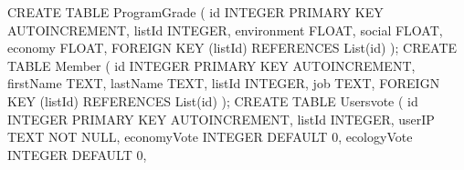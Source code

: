 CREATE TABLE ProgramGrade
    \newline\indent\indent
    (
        \newline\indent\indent\indent
        id INTEGER PRIMARY KEY AUTOINCREMENT,
        \newline\indent\indent\indent
        listId INTEGER,
        \newline\indent\indent\indent
        environment FLOAT,
        \newline\indent\indent\indent
        social FLOAT,
        \newline\indent\indent\indent
        economy FLOAT,
        \newline\indent\indent\indent
        FOREIGN KEY (listId) REFERENCES List(id)
    \newline\indent\indent
    );
\newline\newline
CREATE TABLE Member
    \newline
    \indent\indent
    (
        \newline
        \indent\indent\indent
        id INTEGER PRIMARY KEY AUTOINCREMENT,
        \newline
        \indent\indent\indent
        firstName TEXT,
        \newline
        \indent\indent\indent
        lastName TEXT,
        \newline
        \indent\indent\indent
        listId INTEGER,
        \newline
        \indent\indent\indent
        job TEXT,
        \newline
        \indent\indent\indent
        FOREIGN KEY (listId) REFERENCES List(id)
    \newline
    \indent\indent
    );
\newline\newline
CREATE TABLE Users\textunderscore vote
    \newline\indent\indent
    (
        \newline\indent\indent\indent
        id INTEGER PRIMARY KEY AUTOINCREMENT,
        \newline\indent\indent\indent
        listId INTEGER,
        \newline\indent\indent\indent
        userIP TEXT NOT NULL,
        \newline\indent\indent\indent
        economyVote INTEGER DEFAULT 0,
        \newline\indent\indent\indent
        ecologyVote INTEGER DEFAULT 0,
        \newline\indent\indent\indent
